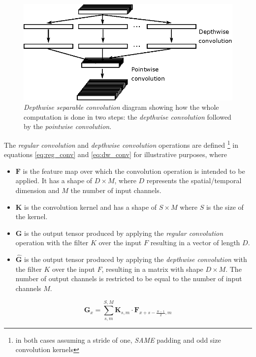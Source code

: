 \documentclass[review]{elsarticle}
\begin{document}
\begin{figure}[ht]
	\centering
	\includegraphics[width=0.8\linewidth]{img/dws_conv}
	\caption{\textit{Depthwise separable convolution} diagram showing how the whole computation is done in two steps: the \textit{depthwise convolution} followed by the \textit{pointwise convolution}.}
	\label{fig:dwsconv}
\end{figure}

The \textit{regular convolution} and \textit{depthwise convolution} operations \cite{Howard2017}  are defined \footnote{in both cases assuming a stride of one, \textit{SAME} padding and odd size convolution kernels} in equations \ref{eq:reg_conv} and  \ref{eq:dw_conv} for illustrative purposes, where 

\begin{itemize}
	\item $\mathbf{F}$ is the feature map over which the convolution operation is intended to be applied. It has a shape of $D \times M$, where $D$ represents the spatial/temporal dimension and $M$ the number of input channels.
	\item $\mathbf{K}$ is the convolution kernel and has a shape of $S \times M$ where $S$ is the size of the kernel.
	\item $\mathbf{G}$ is the output tensor produced by applying the \textit{regular convolution} operation with the filter $K$ over the input $F$ resulting in a vector of length $D$.
	\item $\hat{\mathbf{G}}$ is the output tensor produced by applying the \textit{depthwise convolution} with the filter $K$ over the input $F$, resulting in a matrix with shape $D \times M$. The number of output channels is restricted to be equal to the number of input channels $M$. 
\end{itemize}


\begin{equation}
\mathbf{G}_{x} = \sum_{s, m}^{S,M} \mathbf{K}_{s, m} \cdot \mathbf{F}_{x+s-\frac{S-1}{2}, m}
\label{eq:reg_conv}
\end{equation}
\end{document}
